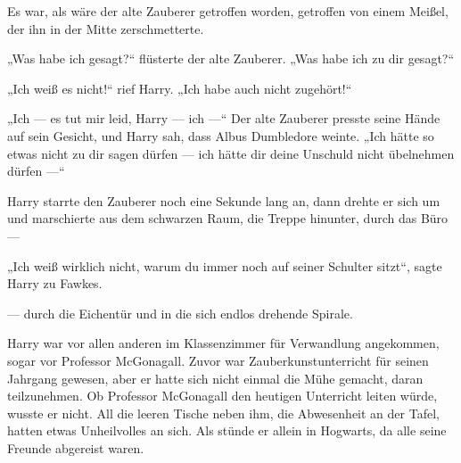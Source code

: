 Es war, als wäre der alte Zauberer getroffen worden, getroffen von einem Meißel, der ihn in der Mitte zerschmetterte.

„Was habe ich gesagt?“ flüsterte der alte Zauberer.
„Was habe ich zu dir gesagt?“

„Ich weiß es nicht!“ rief Harry.
„Ich habe auch nicht zugehört!“

„Ich — es tut mir leid, Harry — ich —“
Der alte Zauberer presste seine Hände auf sein Gesicht, und Harry sah, dass Albus Dumbledore weinte.
„Ich hätte so etwas nicht zu dir sagen dürfen — ich hätte dir deine Unschuld nicht übelnehmen dürfen —“

Harry starrte den Zauberer noch eine Sekunde lang an, dann drehte er sich um und marschierte aus dem schwarzen Raum, die Treppe hinunter, durch das Büro —

„Ich weiß wirklich nicht, warum du immer noch auf seiner Schulter sitzt“, sagte Harry zu Fawkes.

— durch die Eichentür und in die sich endlos drehende Spirale.

\later

Harry war vor allen anderen im Klassenzimmer für Verwandlung angekommen, sogar vor Professor McGonagall. Zuvor war Zauberkunstunterricht für seinen Jahrgang gewesen, aber er hatte sich nicht einmal die Mühe gemacht, daran teilzunehmen. Ob Professor McGonagall den heutigen Unterricht leiten würde, wusste er nicht.
All die leeren Tische neben ihm, die Abwesenheit an der Tafel, hatten etwas Unheilvolles an sich. Als stünde er allein in Hogwarts, da alle seine Freunde abgereist waren.

